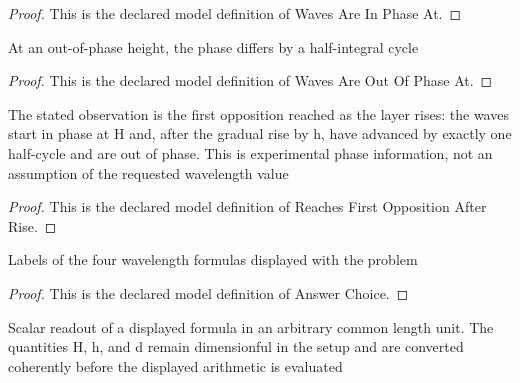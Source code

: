 \begin{proof}
  This is the declared model definition of Waves Are In Phase At.
\end{proof}
\begin{definition}
  \label{def:physics:phyx-mini-0329:phyxminiproblems-problemphyxmini0329-wavesareoutofphaseat}
  At an out-of-phase height, the phase differs by a half-integral cycle
\end{definition}
\begin{proof}
  This is the declared model definition of Waves Are Out Of Phase At.
\end{proof}
\begin{definition}
  \label{def:physics:phyx-mini-0329:phyxminiproblems-problemphyxmini0329-reachesfirstoppositionafterrise}
  The stated observation is the first opposition reached as the layer rises: the waves start in phase at H and, after the gradual rise by h, have advanced by exactly one half-cycle and are out of phase. This is experimental phase information, not an assumption of the requested wavelength value
\end{definition}
\begin{proof}
  This is the declared model definition of Reaches First Opposition After Rise.
\end{proof}
\begin{definition}
  \label{def:physics:phyx-mini-0329:phyxminiproblems-problemphyxmini0329-answerchoice}
  Labels of the four wavelength formulas displayed with the problem
\end{definition}
\begin{proof}
  This is the declared model definition of Answer Choice.
\end{proof}
\begin{definition}
  \label{def:physics:phyx-mini-0329:phyxminiproblems-problemphyxmini0329-displayedwavelengthreadout}
  Scalar readout of a displayed formula in an arbitrary common length unit. The quantities H, h, and d remain dimensionful in the setup and are converted coherently before the displayed arithmetic is evaluated
\end{definition}
